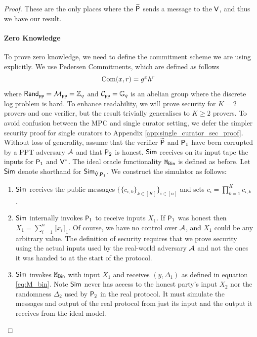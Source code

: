\begin{proof}
These are the only places where the $\mathsf{\widetilde{P}}$ sends a message to the $\mathsf{V}$, and thus we have our result.

\paragraph{\textbf{Zero Knowledge}}

To prove zero knowledge, we need to define the commitment scheme we are using explicitly. We use Pedersen Commitments, which are defined as follows 
\begin{equation}
\label{eq:ped_com}
    \operatorname{Com}(x, r) = g^xh^{r}
\end{equation}
\noindent
where $\mathsf{Rand}_{\texttt{pp}} = \mathcal{M}_{\texttt{pp}}= \mathbb{Z}_q$ and $\mathcal{C}_{\texttt{pp}} = \mathbb{G}_q$ is an abelian group where the discrete log problem is hard. To enhance readability, we will prove security for  $K=2$ provers and one verifier, but the result trivially generalises to $K \geq 2$ provers. To avoid confusion between the MPC and single curator setting, we defer the simpler security proof for single curators to Appendix \ref{app:single_curator_sec_proof}. 
Without loss of generality, assume that the verifier $\mathsf{\widetilde{P}}$ and $\mathsf{P}_1$ have been corrupted by a PPT adversary $\mathcal{A}$ and that $\mathsf{P}_2$ is honest. 
$\mathsf{Sim}$ receives on its input tape the inputs for $\mathsf{P}_1$ and $\mathsf{V}^*$. The ideal oracle functionality $\mathtt{M}_{\mathsf{Bin}}$ is defined as before. Let $\mathsf{Sim}$ denote shorthand for $\mathsf{Sim}_{\mathsf{\hat{V}}, \mathsf{P}_1}$.  We construct the simulator as follows:

\begin{enumerate}
    
    \item{$\mathsf{Sim}$ receives the public messages $\Bigg\{  \Big\{ c_{i,k}  \Big\}_{k \in [K]} \Bigg\}_{i \in [n]}$ and sets $c_{i} = \prod_{k=1}^K c_{i,k}$.}

    \item{$\mathsf{Sim}$ internally invokes $\mathsf{P}_1$ to receive inputs $X_1$. If $\mathsf{P}_1$ was honest then $X_1 = \sum_{i=1}^n \llbracket x_i \rrbracket_1$. Of course, we have no control over $\mathcal{A}$, and $X_1$ could be any arbitrary value. The definition of security requires that we prove security using the actual inputs used by the real-world adversary $\mathcal{A}$ and not the ones it was handed to at the start of the protocol.}

    \item{$\mathsf{Sim}$ invokes $\mathtt{M}_{\mathsf{Bin}}$ with input $X_1$ and receives $(y, \Delta_1)$ as defined in equation \eqref{eq:M_bin}. Note $\mathsf{Sim}$ never has access to the honest party's input $X_2$ nor the randomness $\Delta_2$ used by $\mathsf{P}_2$ in the real protocol. It must simulate the messages and output of the real protocol from just its input and the output it receives from the ideal model.}


\end{enumerate}
\end{proof}
